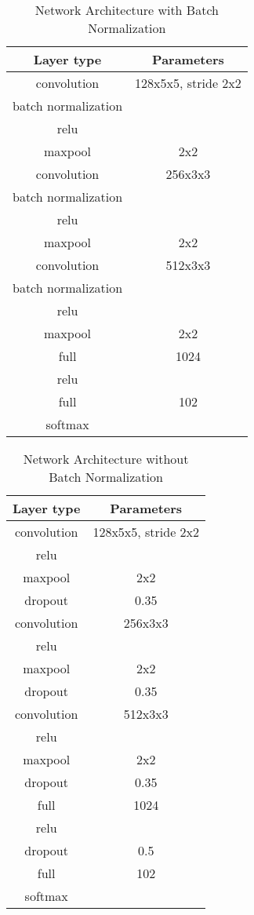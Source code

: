 \documentclass[a4paper, 11pt]{article}
\begin{document}
\begin{table}[!h]
	\begin{center}
		\begin{tabular}{|c|c|}
			\hline Layer type & Parameters \\ 
			\hline convolution & 128x5x5, stride 2x2 \\ 
			\hline batch normalization & \\
			\hline relu &\\
			\hline maxpool &  2x2\\ 
			\hline convolution & 256x3x3 \\ 
			\hline batch normalization & \\
			\hline relu &\\
			\hline maxpool &  2x2\\ 
			\hline convolution & 512x3x3 \\ 
			\hline batch normalization & \\
			\hline relu &\\
			\hline maxpool &  2x2\\ 
			\hline full &  1024 \\ 
			\hline relu &\\
			\hline full &  102 \\
			\hline softmax & \\
			\hline
		\end{tabular}
	\end{center}
	\caption{Network Architecture with Batch Normalization}
\end{table}

\begin{table}[!h]
	\begin{center}
		\begin{tabular}{|c|c|}
			\hline Layer type & Parameters \\ 
			\hline convolution & 128x5x5, stride 2x2 \\ 
			\hline relu &\\
			\hline maxpool &  2x2\\ 
			\hline dropout & 0.35 \\
			\hline convolution & 256x3x3 \\ 
			\hline relu &\\
			\hline maxpool &  2x2\\ 
			\hline dropout & 0.35 \\
			\hline convolution & 512x3x3 \\ 
			\hline relu &\\
			\hline maxpool &  2x2\\ 
			\hline dropout & 0.35 \\
			\hline full &  1024 \\ 
			\hline relu &\\
			\hline dropout & 0.5 \\
			\hline full &  102 \\
			\hline softmax & \\
			\hline
		\end{tabular}
	\end{center}
	\caption{Network Architecture without Batch Normalization}
\end{table}
\end{document}
